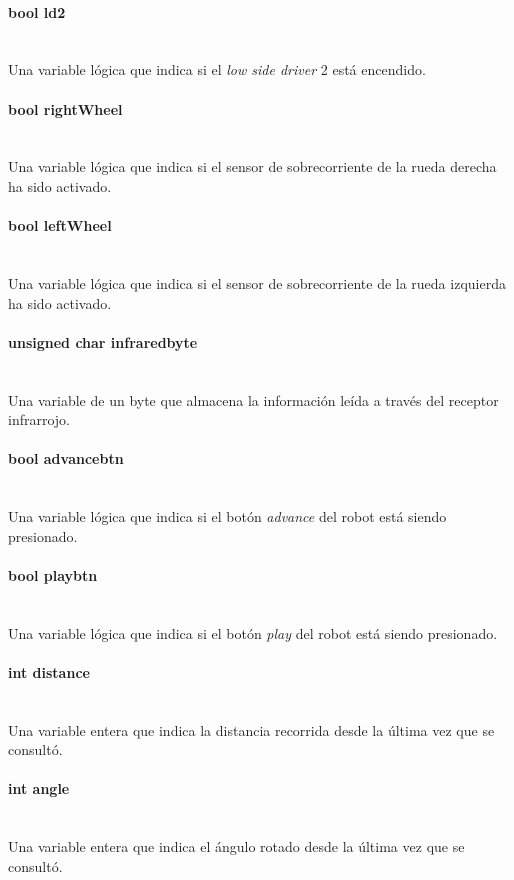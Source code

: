 \documentclass[letterpaper,openright,12pt]{book}
\begin{document}
\paragraph{bool ld2}\mbox{}\\
Una variable lógica que indica si el \emph{low side driver } 2 está encendido.
\paragraph{bool rightWheel}\mbox{}\\
Una variable lógica que indica si el sensor de sobrecorriente de la rueda derecha ha sido activado.
\paragraph{bool leftWheel}\mbox{}\\
Una variable lógica que indica si el sensor de sobrecorriente de la rueda izquierda ha sido activado.
\paragraph{unsigned char infraredbyte}\mbox{}\\
Una variable de un byte que almacena la información leída a través del receptor infrarrojo.
\paragraph{bool advancebtn}\mbox{}\\
Una variable lógica que indica si el botón \emph{advance} del robot está siendo presionado.
\paragraph{bool playbtn}\mbox{}\\
Una variable lógica que indica si el botón \emph{play} del robot está siendo presionado.
\paragraph{int distance}\mbox{}\\
Una variable entera que indica la distancia recorrida desde la última vez que se consultó.
\paragraph{int angle}\mbox{}\\
Una variable entera que indica el ángulo rotado desde la última vez que se consultó.
\end{document}
